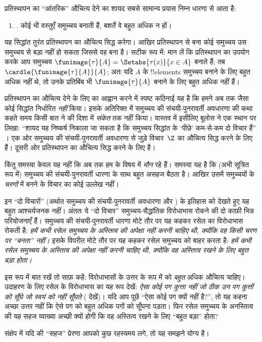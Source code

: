 \documentclass[../../../include/open-logic-section]{subfiles}
\begin{document}

प्रतिस्थापन का ``आंतरिक'' औचित्य देने का शायद सबसे सामान्य प्रयास निम्न
धारणा से आता है:
\begin{enumerate}
	\item[] \limofsize. कोई भी वस्तुएँ समुच्चय बनाती हैं, बशर्ते वे बहुत
	अधिक न हों।
\end{enumerate}
यह सिद्धांत तुरंत प्रतिस्थापन का औचित्य सिद्ध करेगा। आखिर प्रतिस्थापन से बना
कोई समुच्चय उस समुच्चय से बड़ा नहीं हो सकता जिससे वह बना है। सटीक रूप में:
मान लें कि प्रतिस्थापन का उपयोग करके आप समुच्चय
$\funimage{\tau}{A} = \Setabs{\tau(x)}{x \in A}$ बनाते हैं; तब
$\cardle{\funimage{\tau}{A}}{A}$; अतः यदि $A$ के !!{element}s समुच्चय बनाने
के लिए बहुत अधिक नहीं थे, तो उनके प्रतिबिंब भी $\funimage{\tau}{A}$ बनाने
के लिए बहुत अधिक नहीं हैं।

प्रतिस्थापन का औचित्य देने के लिए \limofsize{} का आह्वान करने में स्पष्ट
कठिनाई यह है कि हमने अब तक \limofsize{} जैसा कोई सिद्धांत निर्धारित
\emph{नहीं} किया। इसके अतिरिक्त
 में समुच्चय की संचयी-पुनरावर्ती
अवधारणा की कथा कहते समय किसी बात ने \limofsize{} की दिशा में \emph{संकेत}
तक नहीं किया। वास्तव में इसीलिए बूलोस ने एक स्थान पर लिखा: ``शायद यह
निष्कर्ष निकाला जा सकता है कि समुच्चय सिद्धांत के `पीछे' कम-से-कम दो विचार
हैं'' \citeyearpar[p.~19]{Boolos1989}। एक ओर समुच्चय की संचयी-पुनरावर्ती
अवधारणा से जुड़े विचार~$\Z$ का औचित्य सिद्ध करने के लिए हैं। दूसरी ओर
\limofsize{} प्रतिस्थापन का औचित्य सिद्ध करने के लिए है।

किंतु समस्या केवल यह नहीं कि अब तक हम \limofsize{} के विषय में \emph{मौन}
रहे हैं। समस्या यह है कि \limofsize{} (अभी सूत्रित रूप में) समुच्चय की
संचयी-पुनरावर्ती धारणा के साथ बहुत असहज बैठता है। आखिर उसमें समुच्चयों के
\emph{चरणों} में बनने के विचार का कोई उल्लेख नहीं।

इन ``दो विचारों'' (अर्थात समुच्चय की संचयी-पुनरावर्ती अवधारणा और
\limofsize) के इतिहास को देखते हुए यह बहुत आश्चर्यजनक नहीं। अंततः ये ``दो
विचार'' समुच्चय-सैद्धांतिक विरोधाभास रोकने की दो काफ़ी भिन्न परियोजनाएँ हैं।
समुच्चय की संचयी-पुनरावर्ती धारणा मोटे तौर पर यह कहकर रसेल का विरोधाभास
रोकती है: \emph{हमें कभी रसेल समुच्चय के अस्तित्व की अपेक्षा नहीं करनी चाहिए
थी, क्योंकि वह किसी चरण पर ``बनता'' नहीं।} इसके विपरीत \limofsize{} मोटे
तौर पर यह कहकर रसेल समुच्चय को बाहर करता है: \emph{हमें कभी रसेल समुच्चय के
अस्तित्व की अपेक्षा नहीं करनी चाहिए थी, क्योंकि वह अस्तित्व रखने के लिए बहुत
बड़ा होता।}

इस रूप में बात रखें तो साफ़ कहें: विरोधाभासों के उत्तर के रूप में
\limofsize{} को \emph{बहुत} अधिक औचित्य चाहिए। उदाहरण के लिए रसेल के
विरोधाभास का यह रूप देखें: \emph{ऐसा कोई पग कुत्ता नहीं जो ठीक उन पग
कुत्तों को सूँघे जो स्वयं को नहीं सूँघते}
( देखें)। यदि आप पूछें ``ऐसा कोई पग क्यों नहीं
है?'', तो यह कहना अच्छा उत्तर नहीं कि ऐसे पग को बहुत अधिक पगों को सूँघना
पड़ता। फिर रसेल समुच्चय के अनस्तित्व की यह सहज व्याख्या अच्छी क्यों होगी कि
वह अस्तित्व रखने के लिए ``बहुत बड़ा'' होता?

संक्षेप में यदि \limofsize{} की ``सहज'' प्रेरणा आपको कुछ रहस्यमय लगे, तो यह
समझने योग्य है।
\end{document}
